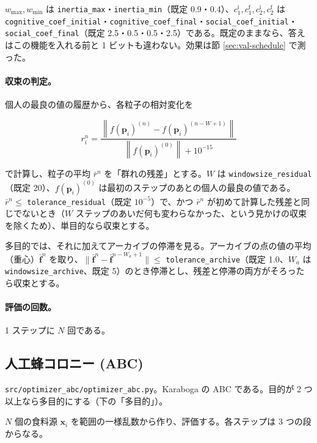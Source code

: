 \documentclass[11pt,a4paper,dvipdfmx]{jsarticle}
\begin{document}
$w_{\max}, w_{\min}$ は \texttt{inertia\_max}・\texttt{inertia\_min}（既定 0.9・0.4）、$c_1^{\mathrm{i}}, c_1^{\mathrm{f}}, c_2^{\mathrm{i}}, c_2^{\mathrm{f}}$ は \texttt{cognitive\_coef\_initial}・\texttt{cognitive\_coef\_final}・\texttt{social\_coef\_initial}・\texttt{social\_coef\_final}（既定 2.5・0.5・0.5・2.5）である。既定のままなら、答えはこの機能を入れる前と 1 ビットも違わない。効果は節 \ref{sec:val-schedule} で測った。

\paragraph{収束の判定。} 個人の最良の値の履歴から、各粒子の相対変化を

\begin{equation}
  r_i^n = \frac{\left\| f(\mathbf{p}_i)^{(n)} - f(\mathbf{p}_i)^{(n-W+1)} \right\|}{\left\| f(\mathbf{p}_i)^{(0)} \right\| + 10^{-15}}
\end{equation}

で計算し、粒子の平均 $\bar r^n$ を「群れの残差」とする。$W$ は \texttt{windowsize\_residual}（既定 20）、$f(\mathbf{p}_i)^{(0)}$ は最初のステップのあとの個人の最良の値である。$\bar r^n \le$ \texttt{tolerance\_residual}（既定 $10^{-5}$）で、かつ $\bar r^n$ が初めて計算した残差と同じでないとき（$W$ ステップのあいだ何も変わらなかった、という見かけの収束を除くため）、単目的なら収束とする。

多目的では、それに加えてアーカイブの停滞を見る。アーカイブの点の値の平均（重心）$\bar{\mathbf{f}}^n$ を取り、$\|\bar{\mathbf{f}}^n - \bar{\mathbf{f}}^{n-W_a+1}\| \le$ \texttt{tolerance\_archive}（既定 1.0、$W_a$ は \texttt{windowsize\_archive}、既定 5）のとき停滞とし、残差と停滞の両方がそろったら収束とする。

\paragraph{評価の回数。} 1 ステップに $N$ 回である。

\subsection{人工蜂コロニー (ABC)}\label{sec:abc}

\texttt{src/optimizer\_abc/optimizer\_abc.py}。Karaboga の ABC \cite{karaboga2005,karaboga2007} である。目的が 2 つ以上なら多目的にする（下の「多目的」）。

$N$ 個の食料源 $\mathbf{x}_i$ を範囲の一様乱数から作り、評価する。各ステップは 3 つの段からなる。
\end{document}
